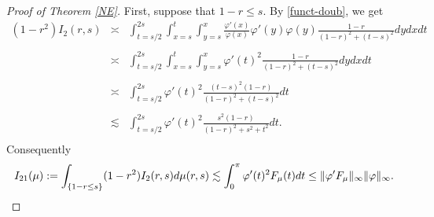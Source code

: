 \documentclass[12pt,reqno,a4paper]{amsart}
\numberwithin{equation}{section}
\begin{document}
\begin{proof}[Proof of Theorem \ref{NE}]
	First, suppose that $1-r\leq s$. By \eqref{funct-doub}, we get
	\[
	\begin{array}{lll}
		(1-r^2)I_2(r,s) & \asymp & \displaystyle \int _{t=s/2}^{2s}  \displaystyle \int _{x =s}^t   \displaystyle \int _{y= s}^x\frac{\varphi'(x)}{\varphi(x)}\varphi'(y)\varphi(y)\frac{1-r}{(1-r)^2+(t-s)^2}dydxdt\\
		\\
		& \asymp &  \displaystyle \int _{t=s/2}^{2s}  \displaystyle \int _{x =s}^t   \displaystyle \int _{y= s}^x\varphi'(t)^2\frac{1-r}{(1-r)^2+(t-s)^2}dydxdt\\
		\\
		& \asymp & \displaystyle \int _{t=s/2}^{2s} \varphi'(t)^2  \frac{(t-s)^2(1-r)}{(1-r)^2+(t-s)^2}dt\\
		\\
		& \lesssim & \displaystyle \int _{t=s/2}^{2s} \varphi'(t)^2  \frac{s^2(1-r)}{(1-r)^2+s^2+t^2}dt.\\
	\end{array}
	\]
	Consequently
		\begin{equation*}
			I_{21}(\mu):=\displaystyle \int _{\{1-r\leq s\}}(1-r^2)I_2(r,s)d\mu(r,s)  \lesssim    \displaystyle \int _{0}^{\pi} \varphi'(t)^2F_\mu(t)dt \leq \| \varphi ' F_\mu\|_\infty \|\varphi\|_\infty.\\\\
		\end{equation*}
		

\end{proof}
\end{document}
